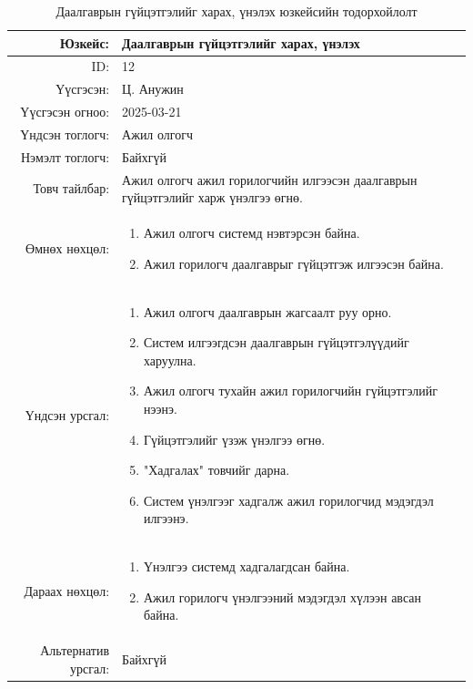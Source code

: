 \begin{longtable}{|r|p{11.5cm}|}
    \caption{Даалгаврын гүйцэтгэлийг харах, үнэлэх юзкейсийн тодорхойлолт}
    \label{table:usecase12}\\ \hline
    {Юзкейс:} & {Даалгаврын гүйцэтгэлийг харах, үнэлэх}\\ \hline
    {ID:} & {12}\\ \hline
    {Үүсгэсэн:} & {Ц. Анужин}\\ \hline
    {Үүсгэсэн огноо:} & {2025-03-21}\\ \hline
    {Үндсэн тоглогч:} & {Ажил олгогч}\\ \hline
    {Нэмэлт тоглогч:} & {Байхгүй}\\ \hline
    {Товч тайлбар:} & {Ажил олгогч ажил горилогчийн илгээсэн даалгаврын гүйцэтгэлийг харж үнэлгээ өгнө.}\\ \hline
    {Өмнөх нөхцөл:} & {\begin{enumerate}[nosep]
        \item Ажил олгогч системд нэвтэрсэн байна.
        \item Ажил горилогч даалгаврыг гүйцэтгэж илгээсэн байна.
    \end{enumerate}}\\ \hline
    {Үндсэн урсгал:} & {\begin{enumerate}[nosep]
        \item Ажил олгогч даалгаврын жагсаалт руу орно.
        \item Систем илгээгдсэн даалгаврын гүйцэтгэлүүдийг харуулна.
        \item Ажил олгогч тухайн ажил горилогчийн гүйцэтгэлийг нээнэ.
        \item Гүйцэтгэлийг үзэж үнэлгээ өгнө.
        \item "Хадгалах" товчийг дарна.
        \item Систем үнэлгээг хадгалж ажил горилогчид мэдэгдэл илгээнэ.
    \end{enumerate}}\\ \hline
    {Дараах нөхцөл:} & {\begin{enumerate}[nosep]
        \item Үнэлгээ системд хадгалагдсан байна.
        \item Ажил горилогч үнэлгээний мэдэгдэл хүлээн авсан байна.
    \end{enumerate}}\\ \hline
    {Альтернатив урсгал:} & {Байхгүй}\\ \hline
\end{longtable}




